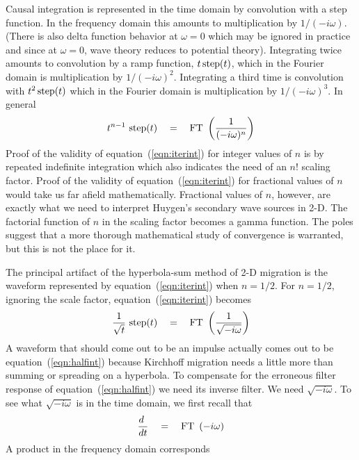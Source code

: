 \par
Causal integration
is represented in the time domain
by convolution with a step function.
In the frequency domain this amounts to multiplication by $1/(-i\omega)$.
(There is also delta function behavior at $\omega=0$
which may be ignored in practice and since
at $\omega=0$, wave theory reduces to potential theory).
Integrating twice amounts to convolution by a ramp function,
$t\, {\rm step}(t)$, which in the Fourier domain is multiplication by
$1/(-i\omega)^2$.
Integrating a third time is convolution with
$t^2\, {\rm step}(t)$ which in the Fourier domain is multiplication by
$1/(-i\omega)^3$.
In general
\def\eq{\quad =\quad}
\begin{equation}
\label{eqn:iterint}
t^{n-1}\ {\rm step}(t) \eq {\rm FT}\ \left( { 1 \over (-i\omega)^n} \right)
\end{equation}
Proof of the validity of equation~(\ref{eqn:iterint}) for integer values of $n$
is by repeated indefinite integration which also indicates
the need of an $n!$ scaling factor.
Proof of the validity of equation~(\ref{eqn:iterint}) for fractional values of $n$
would take us far afield mathematically.
Fractional values of $n$, however,
are exactly what we need to interpret Huygen's secondary wave sources in 2-D.
The factorial function of $n$ in the scaling factor becomes a gamma function.
The poles suggest that a more thorough mathematical study of convergence
is warranted, but this is not the place for it.
\par
The principal artifact
of the hyperbola-sum method of 2-D migration is the waveform
represented by equation~(\ref{eqn:iterint}) when $n=1/2$.
For $n=1/2$, ignoring the scale factor,
equation~(\ref{eqn:iterint}) becomes
\begin{equation}
\label{eqn:halfint}
{1\over \sqrt{t}} \ {\rm step}(t) \eq
{\rm FT}\ \left( { 1 \over \sqrt{-i\omega}} \right)
\end{equation}
A waveform that should come out to be an impulse
actually comes out to be equation~(\ref{eqn:halfint}) because Kirchhoff
migration needs a little more than summing or spreading on a hyperbola.
To compensate for the erroneous filter response of equation~(\ref{eqn:halfint})
we need its inverse filter.
We need $\sqrt{-i\omega}$.
To see what $\sqrt{-i\omega}$ is in the time domain,
we first recall that
\begin{equation}
\label{eqn:derivative}
{d \ \over dt} \eq
{\rm FT}\ \left(  -i\omega \right)
\end{equation}
A product in the frequency domain corresponds
